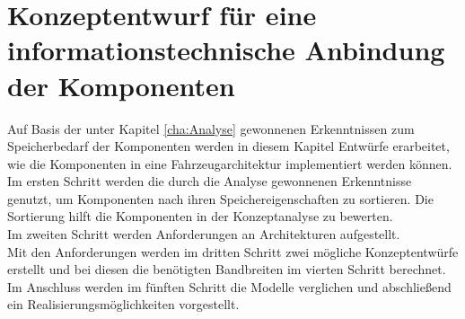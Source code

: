 \chapter{Konzeptentwurf für eine informationstechnische Anbindung der Komponenten} \label{cha:Konzeptentwurf}
Auf Basis der unter Kapitel \ref{cha:Analyse} gewonnenen Erkenntnissen zum Speicherbedarf der Komponenten werden in diesem Kapitel Entwürfe erarbeitet, wie die Komponenten in eine Fahrzeugarchitektur implementiert werden können.\\
Im ersten Schritt werden die durch die Analyse gewonnenen Erkenntnisse genutzt, um Komponenten nach ihren Speichereigenschaften zu sortieren. Die Sortierung hilft die Komponenten in der Konzeptanalyse zu bewerten. \\
Im zweiten Schritt werden Anforderungen an Architekturen aufgestellt. \\
Mit den Anforderungen werden im dritten Schritt zwei mögliche Konzeptentwürfe erstellt und bei diesen die benötigten Bandbreiten im vierten Schritt berechnet. \\
Im Anschluss werden im fünften Schritt die Modelle verglichen und abschließend ein Realisierungsmöglichkeiten vorgestellt.
